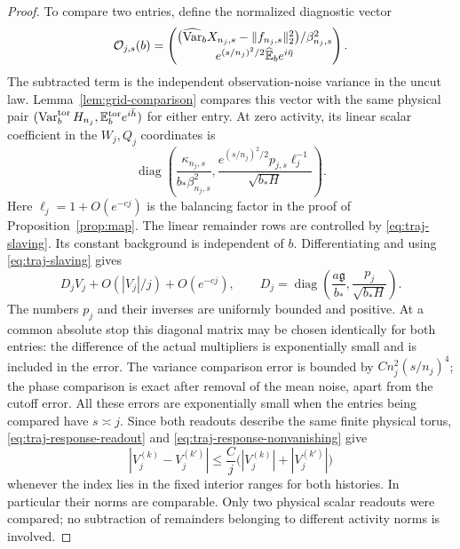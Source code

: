 \begin{proof}
To compare two entries, define the normalized diagnostic vector
\begin{equation}\label{eq:traj-normalized-diagnostic}
 \mathcal{O}_{j,s}(b)=
 \begin{pmatrix}
 \bigl(\widehat{\operatorname{Var}}_b X_{n_j,s}
                  -\|f_{n_j,s}\|_2^2\bigr)/\beta_{n_j,s}^2\\[2pt]
 e^{(s/n_j)^2/2}\widehat{\mathbb E}_b e^{i\bar\eta}
 \end{pmatrix}.
\end{equation}
The subtracted term is the independent observation-noise variance
in the uncut law.  Lemma~\ref{lem:grid-comparison} compares this
vector with the same physical pair
\((\operatorname{Var}_b^{\mathrm{tor}}H_{n_j},
\mathbb E_b^{\mathrm{tor}}e^{i\bar h})\) for either entry.
At zero activity, its linear scalar coefficient in the
\(W_j,Q_j\) coordinates is
\[
 \operatorname{diag}\left(
 \frac{\kappa_{n_j,s}}{b_*\beta_{n_j,s}^2},
 \frac{e^{(s/n_j)^2/2}p_{j,s}\ell_j^{-1}}{\sqrt{b_*H}}\right).
\]
Here \(\ell_j=1+O(e^{-cj})\) is the balancing factor in the
proof of Proposition~\ref{prop:map}.  The linear remainder rows
are controlled by \eqref{eq:traj-slaving}.
Its constant background is independent of \(b\).  Differentiating
and using \eqref{eq:traj-slaving} gives
\begin{equation}\label{eq:traj-response-readout}
 D_jV_j+O(|V_j|/j)+O(e^{-cj}),
 \qquad
 D_j=\operatorname{diag}\left(
       \frac{a\mathfrak g}{b_*},
       \frac{p_j}{\sqrt{b_*H}}\right).
\end{equation}
The numbers \(p_j\) and their inverses are uniformly bounded and
positive.  At a common absolute stop this diagonal matrix may be
chosen identically for both entries: the difference of the actual
multipliers is exponentially small and is included in the error.
The variance comparison error is bounded by
\(Cn_j^2(s/n_j)^4\); the phase comparison is exact after removal
of the mean noise, apart from the cutoff error.  All these errors
are exponentially small when the entries being compared have
\(s\asymp j\).  Since both readouts describe the same finite
physical torus, \eqref{eq:traj-response-readout} and
\eqref{eq:traj-response-nonvanishing} give
\begin{equation}\label{eq:traj-response-overlap}
 |V_j^{(k)}-V_j^{(k')}|
 \le \frac Cj\bigl(|V_j^{(k)}|+|V_j^{(k')}|\bigr)
\end{equation}
whenever the index lies in the fixed interior ranges for both
histories.  In particular their norms are comparable.  Only two
physical scalar readouts were compared; no subtraction of
remainders belonging to different activity norms is involved.


\end{proof}
